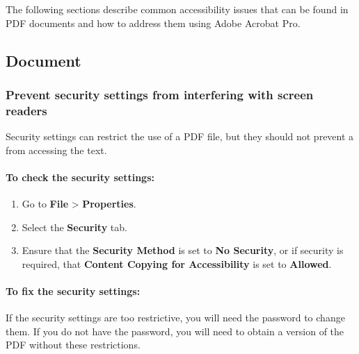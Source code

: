 The following sections describe common accessibility issues that can be found in PDF documents and how to address them using Adobe Acrobat Pro.

\subsection{Document}
\label{sub:document}

\subsubsection{Prevent security settings from interfering with screen readers}
\label{ssub:prevent-security-settings-from-interfering-with-screen-readers}

Security settings can restrict the use of a PDF file, but they should not prevent a  from accessing the text.

\paragraph{To check the security settings:}
\label{par:to-check-the-security-settings}

\begin{enumerate}
	\itemsep-0.5em
	\item Go to \textbf{File} > \textbf{Properties}.
	\item Select the \textbf{Security} tab.
	\item Ensure that the \textbf{Security Method} is set to \textbf{No Security}, or if security is required, that \textbf{Content Copying for Accessibility} is set to \textbf{Allowed}.
\end{enumerate}

\paragraph{To fix the security settings:}
\label{par:to-fix-the-security-settings}

If the security settings are too restrictive, you will need the password to change them. If you do not have the password, you will need to obtain a version of the PDF without these restrictions.

